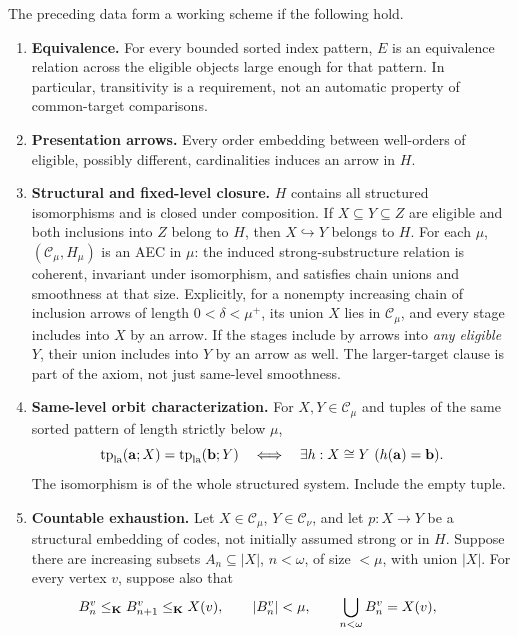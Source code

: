 \begin{definition}\label{def:working-scheme}
The preceding data form a working scheme if the following hold.
\begin{enumerate}[label=\textup{(A\arabic*)},leftmargin=*]
\item\label{ax:la-equivalence} \textbf{Equivalence.} For every bounded sorted index
pattern, $E$ is an equivalence relation across the eligible objects large
enough for that pattern. In particular, transitivity is a requirement,
not an automatic property of common-target comparisons.
\item\label{ax:order-lifts} \textbf{Presentation arrows.} Every order embedding
between well-orders of eligible, possibly different, cardinalities
induces an arrow in $H$.
\item\label{ax:structural-closure} \textbf{Structural and fixed-level closure.}
$H$ contains all structured isomorphisms and is closed under composition.
If $X\subseteq Y\subseteq Z$ are eligible and both inclusions into $Z$
belong to $H$, then $X\hookrightarrow Y$ belongs to $H$.
For each $\mu$, $(\mathcal C_\mu,H_\mu)$ is an AEC in $\mu$:
the induced strong-substructure relation is coherent, invariant under
isomorphism, and satisfies chain unions and smoothness at that size.
Explicitly, for a nonempty increasing chain of inclusion arrows of length
$0<\delta<\mu^+$, its union $X$ lies in $\mathcal C_\mu$, and every stage
includes into $X$ by an arrow. If the stages include by arrows into
\emph{any eligible} $Y$, their union includes into $Y$ by an arrow as well.
The larger-target clause is part of the axiom, not just same-level smoothness.
\item\label{ax:orbit} \textbf{Same-level orbit characterization.} For
$X,Y\in\mathcal C_\mu$ and tuples of the same sorted pattern of length
strictly below $\mu$,
\[
 \operatorname{tp}_{\mathrm{la}}(\mathbf{a};X)=
 \operatorname{tp}_{\mathrm{la}}(\mathbf{b};Y)
 \quad\Longleftrightarrow\quad
 \exists h:X\cong Y\ (h(\mathbf{a})=\mathbf{b}).
\]
The isomorphism is of the whole structured system. Include the empty tuple.
\item\label{ax:exhaustion} \textbf{Countable exhaustion.} Let
$X\in\mathcal C_\mu$, $Y\in\mathcal C_\nu$, and let $p:X\to Y$ be a
structural embedding of codes, not initially assumed strong or in $H$.
Suppose there are increasing subsets $A_n\subseteq|X|$, $n<\omega$,
of size $<\mu$, with union $|X|$. For every vertex $v$, suppose also that
\[
 B^v_n\leq_\mathbf K B^v_{n+1}\leq_\mathbf K X(v),\qquad
 |B^v_n|<\mu,\qquad \bigcup_{n<\omega}B^v_n=X(v),\qquad
\]
\end{enumerate}
\end{definition}
